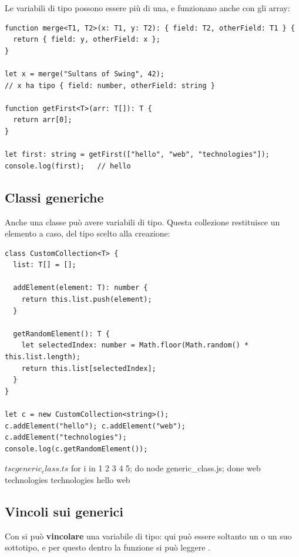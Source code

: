 Le variabili di tipo possono essere più di una, e funzionano anche con gli
array:

\begin{lstlisting}[style=ts, name=merge.ts]
function merge<T1, T2>(x: T1, y: T2): { field: T2, otherField: T1 } {
  return { field: y, otherField: x };
}

let x = merge("Sultans of Swing", 42);
// x ha tipo { field: number, otherField: string }

function getFirst<T>(arr: T[]): T {
  return arr[0];
}

let first: string = getFirst(["hello", "web", "technologies"]);
console.log(first);   // hello
\end{lstlisting}

\subsection{Classi generiche}

Anche una classe può avere variabili di tipo. Questa collezione restituisce un
elemento a caso, del tipo scelto alla creazione:

\begin{lstlisting}[style=ts, name=generic_class.ts]
class CustomCollection<T> {
  list: T[] = [];

  addElement(element: T): number {
    return this.list.push(element);
  }

  getRandomElement(): T {
    let selectedIndex: number = Math.floor(Math.random() * this.list.length);
    return this.list[selectedIndex];
  }
}

let c = new CustomCollection<string>();
c.addElement("hello"); c.addElement("web"); c.addElement("technologies");
console.log(c.getRandomElement());
\end{lstlisting}

\begin{console}[Terminale]
$ tsc generic_class.ts
$ for i in 1 2 3 4 5; do node generic_class.js; done
web
technologies
technologies
hello
web
\end{console}

\subsection{Vincoli sui generici}

Con  si può \textbf{vincolare} una variabile di tipo: qui
 può essere soltanto un  o un suo sottotipo, e per questo
dentro la funzione si può leggere .

